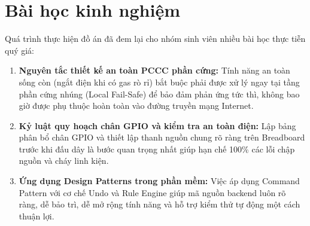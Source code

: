 \section{Bài học kinh nghiệm}
\label{sec:bai_hoc_kinh_nghiem}

Quá trình thực hiện đồ án đã đem lại cho nhóm sinh viên nhiều bài học thực tiễn quý giá:
\begin{enumerate}
    \item \textbf{Nguyên tắc thiết kế an toàn PCCC phần cứng:} Tính năng an toàn sống còn (ngắt điện khi có gas rò rỉ) bắt buộc phải được xử lý ngay tại tầng phần cứng nhúng (Local Fail-Safe) để bảo đảm phản ứng tức thì, không bao giờ được phụ thuộc hoàn toàn vào đường truyền mạng Internet.
    \item \textbf{Kỷ luật quy hoạch chân GPIO và kiểm tra an toàn điện:} Lập bảng phân bổ chân GPIO và thiết lập thanh nguồn chung rõ ràng trên Breadboard trước khi đấu dây là bước quan trọng nhất giúp hạn chế 100\% các lỗi chập nguồn và cháy linh kiện.
    \item \textbf{Ứng dụng Design Patterns trong phần mềm:} Việc áp dụng Command Pattern với cơ chế Undo và Rule Engine giúp mã nguồn backend luôn rõ ràng, dễ bảo trì, dễ mở rộng tính năng và hỗ trợ kiểm thử tự động một cách thuận lợi.
\end{enumerate}

\newpage
